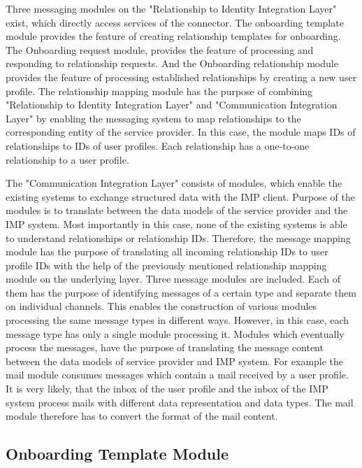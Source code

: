 Three messaging modules on the "Relationship to Identity Integration Layer" exist, which directly access services of the connector. The onboarding template module provides the feature of creating relationship templates for onboarding. The Onboarding request module, provides the feature of processing and responding to relationship requests. And the Onboarding relationship module provides the feature of processing established relationships by creating a new user profile. The relationship mapping module has the purpose of combining "Relationship to Identity Integration Layer" and "Communication Integration Layer" by enabling the messaging system to map relationships to the corresponding entity of the service provider. In this case, the module maps IDs of relationships to IDs of user profiles. Each relationship has a one-to-one relationship to a user profile.

The "Communication Integration Layer" consists of modules, which enable the existing systems to exchange structured data with the IMP client. Purpose of the modules is to translate between the data models of the service provider and the IMP system. Most importantly in this case, none of the existing systems is able to understand relationships or relationship IDs. Therefore, the message mapping module has the purpose of translating all incoming relationship IDs to user profile IDs with the help of the previously mentioned relationship mapping module on the underlying layer. Three message modules are included. Each of them has the purpose of identifying messages of a certain type and separate them on individual channels. This enables the construction of various modules processing the same message types in different ways. However, in this case, each message type has only a single module processing it. Modules which eventually process the messages, have the purpose of translating the message content between the data models of service provider and IMP system. For example the mail module consumes messages which contain a mail received by a user profile. It is very likely, that the inbox of the user profile and the inbox of the IMP system process mails with different data representation and data types. The mail module therefore has to convert the format of the mail content.

\subsection{Onboarding Template Module}

